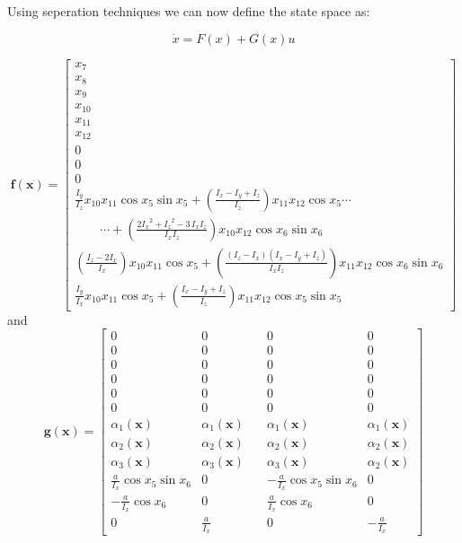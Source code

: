 \documentclass{article}
\begin{document}
Using seperation techniques we can now define the state space as:

\begin{equation}
\dot{x} = F(x) + G(x)u
\end{equation}

\begin{equation}
	\textbf{f}(\textbf{x})=\left[\begin{array}{c}
	x_7\\
	x_8\\
	x_9\\
	x_{10}\\
	x_{11}\\
	x_{12}\\
	0\\
	0\\
	0\\ \frac{I_y}{I_z}x_{10}x_{11}\cos{x}_{5}\sin{x}_{5}+\left(\frac{I_{x}-I_y+I_z}{I_z}\right)x_{11}x_{12}\cos{x}_{5}\cdots\\\qquad\cdots+\left(\frac{2{I_{x}}^2+{I_{z}}^2-3\,I_{x}I_{z}}{I_xI_z}\right)x_{10}x_{12}\cos{x}_{6}\sin{x}_{6}\\
	\left(\frac{I_z-2I_x}{I_x}\right)x_{10}x_{11}\cos{x}_{5}+\left(\frac{(I_z-I_x)(I_x-I_y+I_z)}{I_xI_z}\right)x_{11}x_{12}\cos{x}_{6}\sin{x}_{6}\\
	\frac{I_y}{I_x}x_{10}x_{11}\cos{x}_{5}+\left(\frac{I_{x}-I_y+I_z}{I_z}\right)x_{11}x_{12}\cos{x}_{5}\sin{x}_{5}
	\end{array}\right]
\end{equation}
and
{\scriptsize\begin{equation}
\textbf{g}(\textbf{x})=\left[\begin{array}{cccc}
	0\quad&0\quad&0\quad&0\\
	0\quad&0\quad&0\quad&0\\
	0\quad&0\quad&0\quad&0\\
	0\quad&0\quad&0\quad&0\\
	0\quad&0\quad&0\quad&0\\
	0\quad&0\quad&0\quad&0\\
	\alpha_1(\textbf{x})\quad&\alpha_1(\textbf{x})\quad&\alpha_1(\textbf{x})\quad&\alpha_1(\textbf{x})\\
	\alpha_2(\textbf{x})\quad&\alpha_2(\textbf{x})\quad&\alpha_2(\textbf{x})\quad&\alpha_2(\textbf{x})\\
	\alpha_3(\textbf{x})\quad&\alpha_3(\textbf{x})\quad&\alpha_3(\textbf{x})\quad&\alpha_2(\textbf{x})\\
	\tfrac{a}{I_x}\cos x_5\sin{x_6}&0&-\tfrac{a}{I_x}\cos x_5\sin{x_6}&0\\
	-\tfrac{a}{I_x}\cos x_6&0&\tfrac{a}{I_x}\cos x_6&0\\
	0&\tfrac{a}{I_x}&0&-\tfrac{a}{I_x}
\end{array}\right]
\end{equation}}
\end{document}
